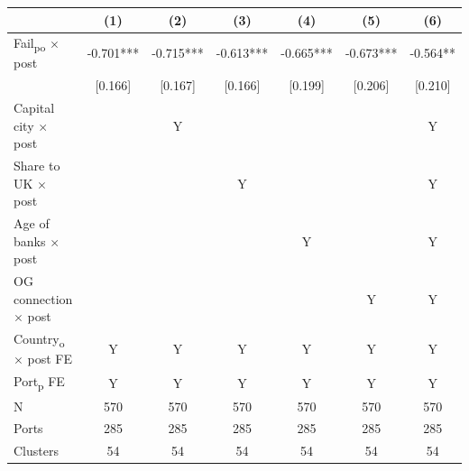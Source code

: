 {
\def\sym#1{\ifmmode^{#1}\else\(^{#1}\)\fi}
\begin{tabular}{l*{6}{c}}
\toprule
            &\multicolumn{1}{c}{(1)}   &\multicolumn{1}{c}{(2)}   &\multicolumn{1}{c}{(3)}   &\multicolumn{1}{c}{(4)}   &\multicolumn{1}{c}{(5)}   &\multicolumn{1}{c}{(6)}   \\
\midrule
Fail\textsubscript{po} $\times$ post&      -0.701***&      -0.715***&      -0.613***&      -0.665***&      -0.673***&      -0.564** \\
            &     [0.166]   &     [0.167]   &     [0.166]   &     [0.199]   &     [0.206]   &     [0.210]   \\
Capital city $\times$ post &               &           Y   &               &               &               &           Y   \\
Share to UK $\times$ post &               &               &           Y   &               &               &           Y   \\
Age of banks $\times$ post&               &               &               &           Y   &               &           Y   \\
OG connection $\times$ post&               &               &               &               &           Y   &           Y   \\
Country\textsubscript{o} $\times$ post FE&           Y   &           Y   &           Y   &           Y   &           Y   &           Y   \\
Port\textsubscript{p} FE &           Y   &           Y   &           Y   &           Y   &           Y   &           Y   \\
\midrule
N           &         570   &         570   &         570   &         570   &         570   &         570   \\
Ports       &         285   &         285   &         285   &         285   &         285   &         285   \\
Clusters    &          54   &          54   &          54   &          54   &          54   &          54   \\
\bottomrule
\end{tabular}
}

